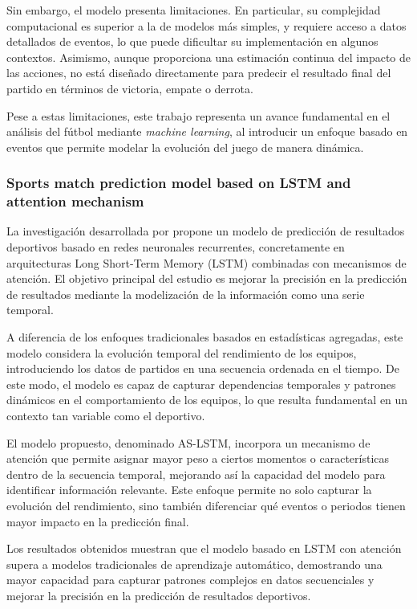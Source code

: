 Sin embargo, el modelo presenta limitaciones. En particular, su complejidad computacional es superior a la de modelos más simples, y requiere acceso a datos detallados de eventos, lo que puede dificultar su implementación en algunos contextos. Asimismo, aunque proporciona una estimación continua del impacto de las acciones, no está diseñado directamente para predecir el resultado final del partido en términos de victoria, empate o derrota.

Pese a estas limitaciones, este trabajo representa un avance fundamental en el análisis del fútbol mediante \textit{machine learning}, al introducir un enfoque basado en eventos que permite modelar la evolución del juego de manera dinámica.

\subsubsection{Sports match prediction model based on LSTM and attention mechanism}

La investigación desarrollada por \cite{zhang2022lstm} propone un modelo de predicción de resultados deportivos basado en redes neuronales recurrentes, concretamente en arquitecturas Long Short-Term Memory (LSTM) combinadas con mecanismos de atención. El objetivo principal del estudio es mejorar la precisión en la predicción de resultados mediante la modelización de la información como una serie temporal.

A diferencia de los enfoques tradicionales basados en estadísticas agregadas, este modelo considera la evolución temporal del rendimiento de los equipos, introduciendo los datos de partidos en una secuencia ordenada en el tiempo. De este modo, el modelo es capaz de capturar dependencias temporales y patrones dinámicos en el comportamiento de los equipos, lo que resulta fundamental en un contexto tan variable como el deportivo.

El modelo propuesto, denominado AS-LSTM, incorpora un mecanismo de atención que permite asignar mayor peso a ciertos momentos o características dentro de la secuencia temporal, mejorando así la capacidad del modelo para identificar información relevante. Este enfoque permite no solo capturar la evolución del rendimiento, sino también diferenciar qué eventos o periodos tienen mayor impacto en la predicción final.

Los resultados obtenidos muestran que el modelo basado en LSTM con atención supera a modelos tradicionales de aprendizaje automático, demostrando una mayor capacidad para capturar patrones complejos en datos secuenciales y mejorar la precisión en la predicción de resultados deportivos.

